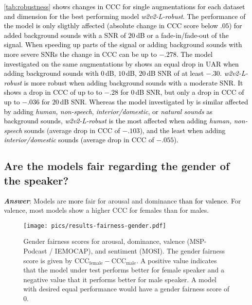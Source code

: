 \documentclass{article}
\newcommand\wrobust{\mbox{\emph{w2v2-L-robust}}}
\newcommand{\review}[1]{\textcolor{black}{#1}}
\newcommand\msppodcast{\mbox{MSP-Podcast}}
\newcommand\iemocap{\mbox{IEMOCAP}}
\newcommand\mosi{\mbox{MOSI}}
\begin{document}
\review{
\cref{tab:robustness} shows changes in \ac{CCC} for single augmentations
for each dataset and dimension
for the best performing model {\wrobust}.
The performance of the model is only sligthly affected
(absolute change in \ac{CCC} score below $.05$)
for added background sounds with a \ac{SNR} of $20$\,dB
or a fade-in/fade-out of the signal.
When speeding up parts of the signal or adding background sounds
with more severe \acp{SNR}
the change in \ac{CCC} can be up to $-.278$.
The model investigated on the same augmentations
by \citet{jaiswal2021robustness}
shows an equal drop in \ac{UAR}
when adding background sounds
with $0$\,dB, $10$\,dB, $20$\,dB \ac{SNR}
of at least $-.30$.
{\wrobust} is more robust when adding
background sounds with a moderate \ac{SNR}.
It shows a drop in \ac{CCC} of up to to $-.28$ for $0$\,dB SNR,
but only a drop in \ac{CCC} of up to $-.036$ for $20$\,dB SNR.
Whereas the model investigated by \citet{jaiswal2021robustness}
is similar affected by adding
\emph{human, non-speech}, \emph{interior/domestic}, or \emph{natural sounds}
as background sounds,
{\wrobust} is the most affected when adding \emph{human, non-speech} sounds (average drop in \ac{CCC} of $-.103$),
and the least when adding \emph{interior/domestic} sounds
(average drop in \ac{CCC} of $-.055$).
}





\subsection{Are the models fair regarding the gender of the speaker?}
\label{subsec:fairness}

\emph{\textbf{Answer}}:
Models are \review{more} fair for arousal and dominance
\review{than for valence}.
For valence,
most models show a higher \ac{CCC} for females than for males.


\begin{figure}[t]
    \centering
    \texttt{[image: pics/results-fairness-gender.pdf]}
    \caption{Gender fairness scores for arousal, dominance, valence ({\msppodcast} / {\iemocap}), and sentiment ({\mosi}). The gender fairness score is given by $\text{CCC}_\text{female} - \text{CCC}_\text{male}$. A positive value indicates that the model under test performs better for female speaker and a negative value that it performs better for male speaker. A model with desired equal performance would have a gender fairness score of 0.
    }
    \label{fig:fairness}
\end{figure}
\end{document}
